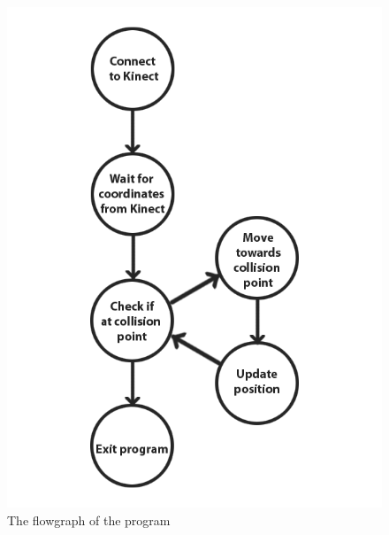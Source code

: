 \begin{figure}[h]
	\centering
	\includegraphics[scale=0.25]{billeder/flowgraph.png}
	\caption{The flowgraph of the program}
	\label{figure:flowgraph}
\end{figure}


